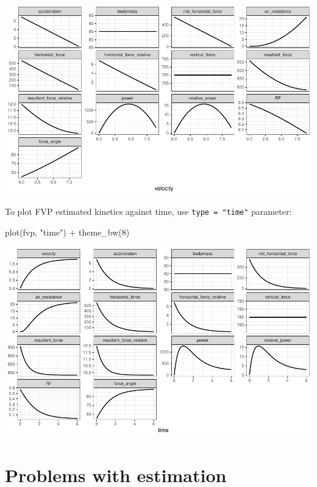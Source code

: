 \documentclass[fleqn,10pt,lineno]{wlpeerj} %
\newenvironment{Shaded}{\begin{snugshade}}{\end{snugshade}}
\newcommand{\DecValTok}[1]{\textcolor[rgb]{0.00,0.00,0.81}{#1}}
\newcommand{\FunctionTok}[1]{\textcolor[rgb]{0.00,0.00,0.00}{#1}}
\newcommand{\NormalTok}[1]{#1}
\newcommand{\SpecialCharTok}[1]{\textcolor[rgb]{0.00,0.00,0.00}{#1}}
\newcommand{\StringTok}[1]{\textcolor[rgb]{0.31,0.60,0.02}{#1}}
\begin{document}
\begin{center}\includegraphics[width=1\linewidth]{paper_files/figure-latex/unnamed-chunk-22-1} \end{center}

To plot FVP estimated kinetics against time, use \texttt{type\ =\ "time"} parameter:

\begin{Shaded}
\begin{Highlighting}[]
\FunctionTok{plot}\NormalTok{(fvp, }\StringTok{"time"}\NormalTok{) }\SpecialCharTok{+} \FunctionTok{theme\_bw}\NormalTok{(}\DecValTok{8}\NormalTok{)}
\end{Highlighting}
\end{Shaded}

\begin{center}\includegraphics[width=1\linewidth]{paper_files/figure-latex/unnamed-chunk-23-1} \end{center}

\hypertarget{problems-with-estimation}{%
\section{Problems with estimation}\label{problems-with-estimation}}
\end{document}
